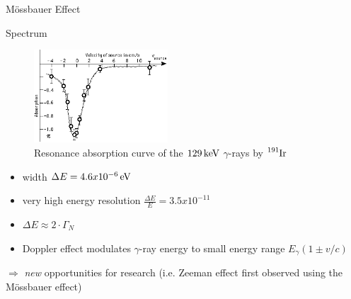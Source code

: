 	\begin{frame}{Mössbauer Effect}
	
		\begin{block}{Spectrum}
			\begin{minipage}[t][.65\textheight][t]{.48\textwidth}
				\begin{figure}
					\includegraphics[width=5cm]{images/moessbauer-effect.png}
					\caption{Resonance absorption curve of the $\unit[129]{keV}$ $\gamma$-rays by $\ce{^{191}Ir}$ \cite{web:mossbauertheory}}
				\end{figure}
			\end{minipage}
			\begin{minipage}[t][.65\textheight][c]{.48\textwidth}
				\begin{itemize}
					\item width $\Delta E =\unit[4.6 x 10^{-6}]{eV}$
					\item very high energy resolution $\frac{\Delta E}{E}=3.5 x 10^{-11}$
					\item $\Delta E \approx 2 \cdot \Gamma_N$
					\item Doppler effect modulates $\gamma$-ray energy to small energy range $E_{\gamma}(1 \pm v/c)$
				\end{itemize}
			\end{minipage}
		\end{block}
	
		$\Rightarrow$ \emph{new} opportunities for research (i.e. Zeeman effect first observed using the Mössbauer effect)	
	
	\end{frame}

